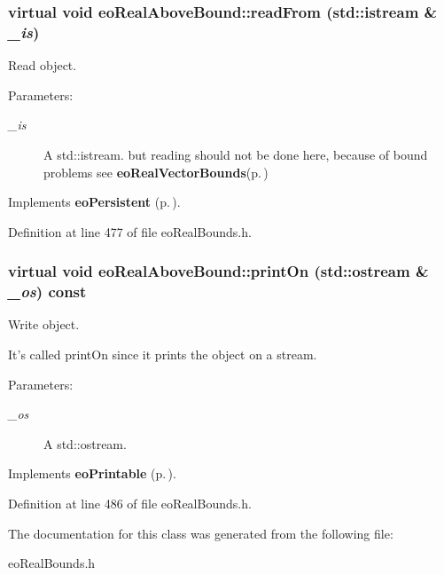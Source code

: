 \subsubsection{\setlength{\rightskip}{0pt plus 5cm}virtual void eo\-Real\-Above\-Bound::read\-From (std::istream \& {\em \_\-is})\hspace{0.3cm}{\tt  [inline, virtual]}}\label{classeo_real_above_bound_a13}


Read object. 

\begin{Desc}
\item[Parameters:]
\begin{description}
\item[{\em \_\-is}]A std::istream. but reading should not be done here, because of bound problems see {\bf eo\-Real\-Vector\-Bounds}{\rm (p.\,\pageref{classeo_real_vector_bounds})} \end{description}
\end{Desc}


Implements {\bf eo\-Persistent} {\rm (p.\,\pageref{classeo_persistent_a1})}.

Definition at line 477 of file eo\-Real\-Bounds.h.
\subsubsection{\setlength{\rightskip}{0pt plus 5cm}virtual void eo\-Real\-Above\-Bound::print\-On (std::ostream \& {\em \_\-os}) const\hspace{0.3cm}{\tt  [inline, virtual]}}\label{classeo_real_above_bound_a14}


Write object. 

It's called print\-On since it prints the object on a stream. \begin{Desc}
\item[Parameters:]
\begin{description}
\item[{\em \_\-os}]A std::ostream. \end{description}
\end{Desc}


Implements {\bf eo\-Printable} {\rm (p.\,\pageref{classeo_printable_a1})}.

Definition at line 486 of file eo\-Real\-Bounds.h.

The documentation for this class was generated from the following file:\begin{CompactItemize}
\item 
eo\-Real\-Bounds.h\end{CompactItemize}
